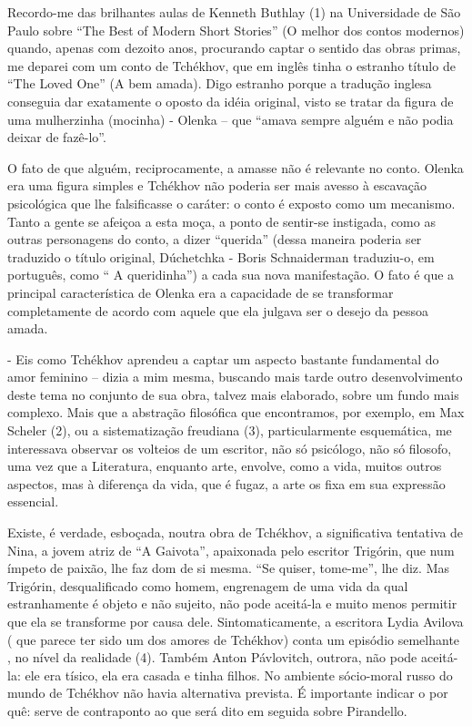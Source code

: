 Recordo-me das brilhantes aulas de Kenneth Buthlay (1) na Universidade
de São Paulo sobre ``The Best of Modern Short Stories'' (O melhor dos
contos modernos) quando, apenas com dezoito anos, procurando captar o
sentido das obras primas, me deparei com um conto de Tchékhov, que em
inglês tinha o estranho título de ``The Loved One'' (A bem amada). Digo
estranho porque a tradução inglesa conseguia dar exatamente o oposto da
idéia original, visto se tratar da figura de uma mulherzinha (mocinha) -
Olenka -- que ``amava sempre alguém e não podia deixar de fazê-lo''.

O fato de que alguém, reciprocamente, a amasse não é relevante no conto.
Olenka era uma figura simples e Tchékhov não poderia ser mais avesso à
escavação psicológica que lhe falsificasse o caráter: o conto é exposto
como um mecanismo. Tanto a gente se afeiçoa a esta moça, a ponto de
sentir-se instigada, como as outras personagens do conto, a dizer
``querida'' (dessa maneira poderia ser traduzido o título original,
Dúchetchka - Boris Schnaiderman traduziu-o, em português, como `` A
queridinha'') a cada sua nova manifestação. O fato é que a principal
característica de Olenka era a capacidade de se transformar
completamente de acordo com aquele que ela julgava ser o desejo da
pessoa amada.

- Eis como Tchékhov aprendeu a captar um aspecto bastante fundamental do
amor feminino -- dizia a mim mesma, buscando mais tarde outro
desenvolvimento deste tema no conjunto de sua obra, talvez mais
elaborado, sobre um fundo mais complexo. Mais que a abstração filosófica
que encontramos, por exemplo, em Max Scheler (2), ou a sistematização
freudiana (3), particularmente esquemática, me interessava observar os
volteios de um escritor, não só psicólogo, não só filosofo, uma vez que
a Literatura, enquanto arte, envolve, como a vida, muitos outros
aspectos, mas à diferença da vida, que é fugaz, a arte os fixa em sua
expressão essencial.

Existe, é verdade, esboçada, noutra obra de Tchékhov, a significativa
tentativa de Nina, a jovem atriz de ``A Gaivota'', apaixonada pelo
escritor Trigórin, que num ímpeto de paixão, lhe faz dom de si mesma.
``Se quiser, tome-me'', lhe diz. Mas Trigórin, desqualificado como
homem, engrenagem de uma vida da qual estranhamente é objeto e não
sujeito, não pode aceitá-la e muito menos permitir que ela se transforme
por causa dele. Sintomaticamente, a escritora Lydia Avilova ( que parece
ter sido um dos amores de Tchékhov) conta um episódio semelhante , no
nível da realidade (4). Também Anton Pávlovitch, outrora, não pode
aceitá-la: ele era tísico, ela era casada e tinha filhos. No ambiente
sócio-moral russo do mundo de Tchékhov não havia alternativa prevista. É
importante indicar o por quê: serve de contraponto ao que será dito em
seguida sobre Pirandello.

